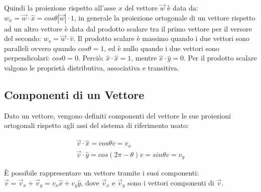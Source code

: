 \documentclass{article}
\numberwithin{equation}{subsection}
\begin{document}
Quindi la proiezione rispetto all'asse $x$ del vettore 
$\vec{w}$ è data da: $w_x = \vec{w}\cdot\hat{x}= 
cos\theta|\vec{w}|\cdot1$, in generale la proiezione 
ortogonale di un vettore rispetto ad un altro vettore è 
data dal prodotto scalare tra il primo vettore per il versore 
del secondo: $w_v = \vec{w}\cdot\hat{v}$.
Il prodotto scalare è massimo quando i due vettori sono 
paralleli ovvero quando $cos\theta = 1$, ed è nullo
quando i due vettori sono perpendicolari: $cos0 = 0$.
Perciò: $\hat{x}\cdot\hat{x} = 1$, mentre $\hat{x}\cdot\hat{y} = 0$. 
Per il prodotto scalare valgono le proprietà distributiva, associativa e
transitiva. 

\subsection{Componenti di un Vettore}
Dato un vettore, vengono definiti componenti del vettore le sue proiezioni ortogonali rispetto agli assi del sistema di riferimento usato:

\begin{gather}
    \vec{v}\cdot\hat{x} = cos\theta v = v_x\\
    \vec{v}\cdot\hat{y} = cos(2\pi - \theta) v = sin\theta v = v_y
\end{gather}

\`{E} possibile rappresentare un vettore tramite i suoi componenti: $\vec{v} = \vec{v}_x + \vec{v}_y = v_x\hat{x} + v_y\hat{y}$, dove $\vec{v}_x$ e $\vec{v}_y$ sono i vettori componenti di $\vec{v}$.

\begin{center}\end{center}
\end{document}
